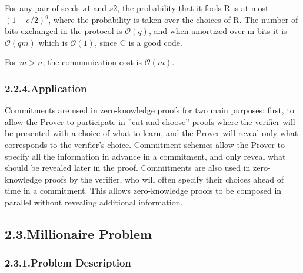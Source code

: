 \documentclass{article}
\begin{document}
For any pair of seeds $s1$ and $s2$, the probability that it fools R
is at most $(1 - e/2)^q$, where the probability is taken over the choices of R.
The number of bits exchanged in the protocol is $\mathcal{O}(q)$, and when amortized
over m bits it is $\mathcal{O}(qm)$ which is $\mathcal{O}(1)$, since C is a good code.%

For $m>n$, the communication cost is $\mathcal{O}(m)$.%

\subsubsection{2.2.4.\hspace*{0.5em}Application}\label{sec-application}%

\noindent{}Commitments are used in zero-knowledge proofs for two main purposes: first,
to allow the Prover to participate in ”cut and choose” proofs where the verifier will be presented with a choice of what to learn, and the Prover will
reveal only what corresponds to the verifier’s choice. Commitment schemes
allow the Prover to specify all the information in advance in a commitment,
and only reveal what should be revealed later in the proof. Commitments
are also used in zero-knowledge proofs by the verifier, who will often specify
their choices ahead of time in a commitment. This allows zero-knowledge
proofs to be composed in parallel without revealing additional information.%

\subsection{2.3.\hspace*{0.5em}Millionaire Problem}\label{sec-millionaire-problem}%

\subsubsection{2.3.1.\hspace*{0.5em}Problem Description}\label{sec-problem-description}%
\end{document}
